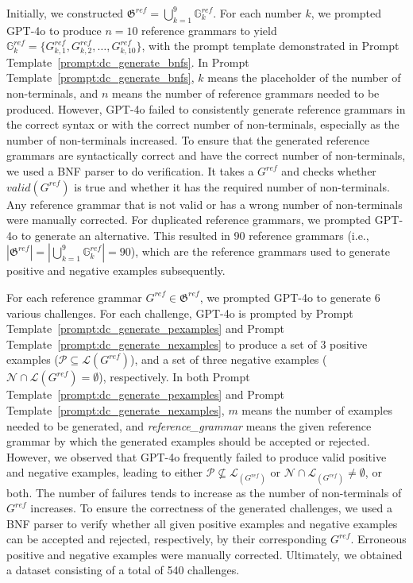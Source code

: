 Initially, we constructed $\mathfrak{G}^{ref} = \bigcup_{k=1}^9 \mathbb{G}^{ref}_{k}$. For each number $k$, we prompted GPT-4o to produce $n=10$ reference grammars to yield $\mathbb{G}^{ref}_{k}=\{G^{ref}_{k,1}, G^{ref}_{k,2}, \dots, G^{ref}_{k,10}\}$, with the prompt template demonstrated in Prompt Template~\ref{prompt:dc_generate_bnfs}. In Prompt Template~\ref{prompt:dc_generate_bnfs}, $k$ means the placeholder of the number of non-terminals, and $n$ means the number of reference grammars needed to be produced. However, GPT-4o failed to consistently generate reference grammars in the correct syntax or with the correct number of non-terminals, especially as the number of non-terminals increased. To ensure that the generated reference grammars are syntactically correct and have the correct number of non-terminals, we used a BNF parser to do verification. It takes a $G^{ref}$ and checks whether $valid(G^{ref})$ is true and whether it has the required number of non-terminals. Any reference grammar that is not valid or has a wrong number of non-terminals were manually corrected. For duplicated reference grammars, we prompted GPT-4o to generate an alternative. This resulted in 90 reference grammars (i.e., $|\mathfrak{G}^{ref}| = |\bigcup_{k=1}^{9} \mathbb{G}^{ref}_{k}| = 90$), which are the reference grammars used to generate positive and negative examples subsequently.

For each reference grammar $G^{ref} \in \mathfrak{G}^{ref}$, we prompted GPT-4o to generate $6$ various challenges. For each challenge, GPT-4o is prompted by Prompt Template~\ref{prompt:dc_generate_pexamples} and Prompt Template~\ref{prompt:dc_generate_nexamples} to produce a set of $3$ positive examples ($\mathcal{P} \subseteq \mathcal{L}(G^{ref})$), and a set of three negative examples ($\mathcal{N} \cap \mathcal{L}(G^{ref}) = \emptyset$), respectively. In both Prompt Template~\ref{prompt:dc_generate_pexamples} and Prompt Template~\ref{prompt:dc_generate_nexamples}, $m$ means the number of examples needed to be generated, and \textit{reference\_grammar} means the given reference grammar by which the generated examples should be accepted or rejected. However, we observed that GPT-4o frequently failed to produce valid positive and negative examples, leading to either $\mathcal{P} \not\subseteq \mathcal{L}_(G^{ref})$ or $\mathcal{N} \cap \mathcal{L}_(G^{ref}) \neq \emptyset$, or both. The number of failures tends to increase as the number of non-terminals of $G^{ref}$ increases. To ensure the correctness of the generated challenges, we used a BNF parser to verify whether all given positive examples and negative examples can be accepted and rejected, respectively, by their corresponding $G^{ref}$. Erroneous positive and negative examples were manually corrected. Ultimately, we obtained a dataset consisting of a total of 540 challenges.

